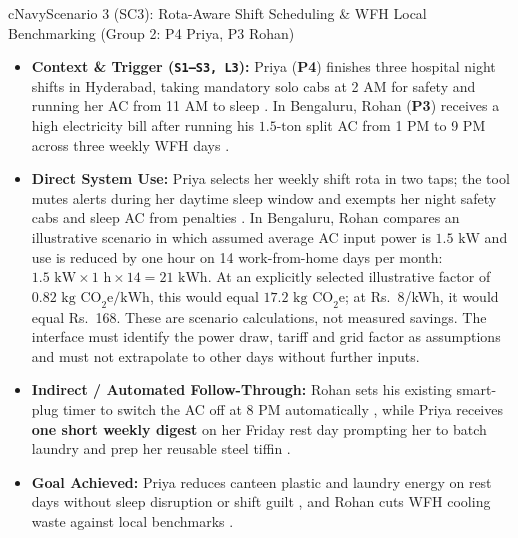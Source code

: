 \documentclass[12pt, a4paper]{article}
\begin{document}
\begin{scenariocard}{cNavy}{Scenario 3 (SC3): Rota-Aware Shift Scheduling \& WFH Local Benchmarking (Group 2: P4 Priya, P3 Rohan)}
\footnotesize
\begin{itemize}
    \item \textbf{Context \& Trigger (\texttt{S1--S3, L3}):} Priya (\textbf{P4}) finishes three hospital night shifts in Hyderabad, taking mandatory solo cabs at 2 AM for safety and running her AC from 11 AM to sleep \cite{cf9}. In Bengaluru, Rohan (\textbf{P3}) receives a high electricity bill after running his $1.5\text{-ton}$ split AC from 1 PM to 9 PM across three weekly WFH days \cite{cf2}.
    \item \textbf{Direct System Use:} Priya selects her weekly shift rota in two taps; the tool mutes alerts during her daytime sleep window and exempts her night safety cabs and sleep AC from penalties \cite{cf9}. In Bengaluru, Rohan compares an illustrative scenario in which assumed average AC input power is $1.5\text{ kW}$ and use is reduced by one hour on 14 work-from-home days per month: $1.5\text{ kW} \times 1\text{ h} \times 14 = 21\text{ kWh}$. At an explicitly selected illustrative factor of $0.82\text{ kg CO}_2\text{e/kWh}$, this would equal $17.2\text{ kg CO}_2\text{e}$; at Rs.\ 8/kWh, it would equal Rs.\ 168. These are scenario calculations, not measured savings. The interface must identify the power draw, tariff and grid factor as assumptions and must not extrapolate to other days without further inputs.
    \item \textbf{Indirect / Automated Follow-Through:} Rohan sets his existing smart-plug timer to switch the AC off at 8 PM automatically \cite{cf2}, while Priya receives \textbf{one short weekly digest} on her Friday rest day prompting her to batch laundry and prep her reusable steel tiffin \cite{cf9}.
    \item \textbf{Goal Achieved:} Priya reduces canteen plastic and laundry energy on rest days without sleep disruption or shift guilt \cite{cf9}, and Rohan cuts WFH cooling waste against local benchmarks \cite{cf2}.
\end{itemize}
\end{scenariocard}
\end{document}

